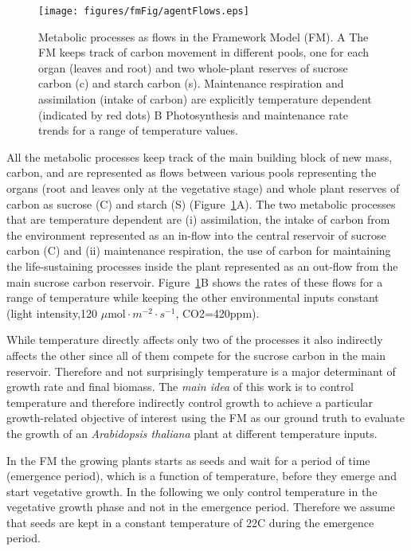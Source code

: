 \begin{figure}[tb]
\centering
\texttt{[image: figures/fmFig/agentFlows.eps]}
\caption{Metabolic processes as flows in the Framework Model (FM). A The FM
  keeps track of carbon movement in different pools, one for each organ (leaves
  and root) and two whole-plant reserves of sucrose carbon (c) and starch carbon
  (s). Maintenance respiration and assimilation (intake of carbon) are
  explicitly temperature dependent (indicated by red dots) B Photosynthesis and
  maintenance rate trends for a range of temperature values.}
\label{fig:fm}
\end{figure}

All the metabolic processes keep track of the main building block of new mass,
carbon, and are represented as flows between various pools representing the
organs (root and leaves only at the vegetative stage) and whole plant reserves
of carbon as sucrose (C) and starch (S) (Figure~\ref{fig:fm}A). The two
metabolic processes that are temperature dependent are (i) assimilation, the
intake of carbon from the environment represented as an in-flow into the central
reservoir of sucrose carbon (C) and (ii) maintenance respiration, the use of
carbon for maintaining the life-sustaining processes inside the plant
represented as an out-flow from the main sucrose carbon
reservoir. Figure~\ref{fig:fm}B shows the rates of these flows for a range of
temperature while keeping the other environmental inputs constant (light
intensity,120 $\mu \mathrm{mol} \cdot m^{-2} \cdot s^{-1}$, CO2=420ppm).

While temperature directly affects only two of the processes it also indirectly
affects the other since all of them compete for the sucrose carbon in the main
reservoir. Therefore and not surprisingly temperature is a major determinant of
growth rate and final biomass. The \emph{main idea} of this work is to control
temperature and therefore indirectly control growth to achieve a particular
growth-related objective of interest using the FM as our ground truth to
evaluate the growth of an \textit{Arabidopsis thaliana} plant at different
temperature inputs.

In the FM the growing plants starts as seeds and wait for a period of time
(emergence period), which is a function of temperature, before they emerge and
start vegetative growth. In the following we only control temperature in the
vegetative growth phase and not in the emergence period. Therefore we assume
that seeds are kept in a constant temperature of 22\textdegree C during the
emergence period.


